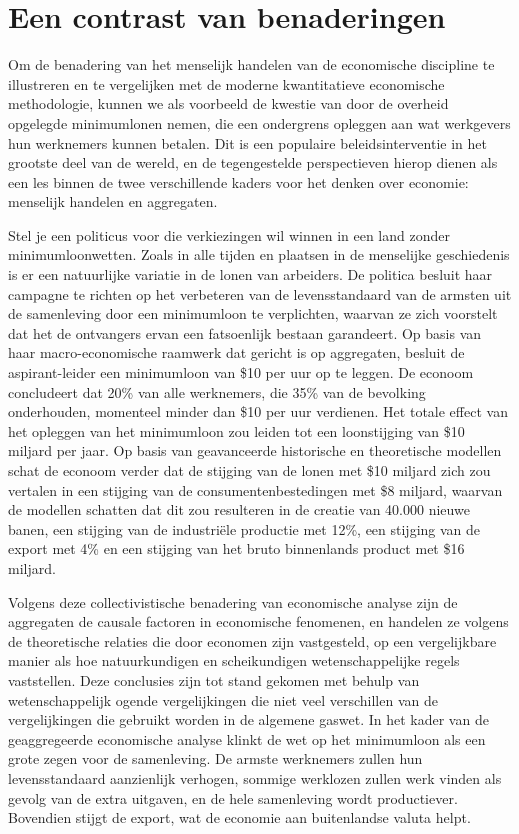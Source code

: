 \documentclass[
  a5paper,
  smalldemyvopaper,11pt,twoside,onecolumn,openright,extrafontsizes,
hidelinks]{memoir}
\begin{document}
\section{Een contrast van
benaderingen}\label{een-contrast-van-benaderingen}

Om de benadering van het menselijk handelen van de economische
discipline te illustreren en te vergelijken met de moderne kwantitatieve
economische methodologie, kunnen we als voorbeeld de kwestie van door de
overheid opgelegde minimumlonen nemen, die een ondergrens opleggen aan
wat werkgevers hun werknemers kunnen betalen. Dit is een populaire
beleidsinterventie in het grootste deel van de wereld, en de
tegengestelde perspectieven hierop dienen als een les binnen de twee
verschillende kaders voor het denken over economie: menselijk handelen
en aggregaten.

Stel je een politicus voor die verkiezingen wil winnen in een land
zonder minimumloonwetten. Zoals in alle tijden en plaatsen in de
menselijke geschiedenis is er een natuurlijke variatie in de lonen van
arbeiders. De politica besluit haar campagne te richten op het
verbeteren van de levensstandaard van de armsten uit de samenleving door
een minimumloon te verplichten, waarvan ze zich voorstelt dat het de
ontvangers ervan een fatsoenlijk bestaan garandeert. Op basis van haar
macro-economische raamwerk dat gericht is op aggregaten, besluit de
aspirant-leider een minimumloon van \$10 per uur op te leggen. De
econoom concludeert dat 20\% van alle werknemers, die 35\% van de
bevolking onderhouden, momenteel minder dan \$10 per uur verdienen. Het
totale effect van het opleggen van het minimumloon zou leiden tot een
loonstijging van \$10 miljard per jaar. Op basis van geavanceerde
historische en theoretische modellen schat de econoom verder dat de
stijging van de lonen met \$10 miljard zich zou vertalen in een stijging
van de consumentenbestedingen met \$8 miljard, waarvan de modellen
schatten dat dit zou resulteren in de creatie van 40.000 nieuwe banen,
een stijging van de industriële productie met 12\%, een stijging van de
export met 4\% en een stijging van het bruto binnenlands product met
\$16 miljard.

Volgens deze collectivistische benadering van economische analyse zijn
de aggregaten de causale factoren in economische fenomenen, en handelen
ze volgens de theoretische relaties die door economen zijn vastgesteld,
op een vergelijkbare manier als hoe natuurkundigen en scheikundigen
wetenschappelijke regels vaststellen. Deze conclusies zijn tot stand
gekomen met behulp van wetenschappelijk ogende vergelijkingen die niet
veel verschillen van de vergelijkingen die gebruikt worden in de
algemene gaswet. In het kader van de geaggregeerde economische analyse
klinkt de wet op het minimumloon als een grote zegen voor de
samenleving. De armste werknemers zullen hun levensstandaard aanzienlijk
verhogen, sommige werklozen zullen werk vinden als gevolg van de extra
uitgaven, en de hele samenleving wordt productiever. Bovendien stijgt de
export, wat de economie aan buitenlandse valuta helpt.
\end{document}

